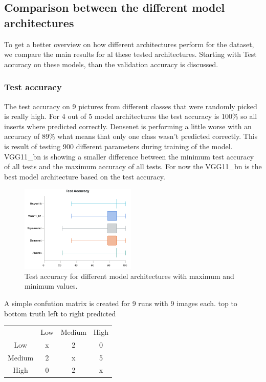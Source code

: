 \subsection{Comparison between the different model architectures}
	To get a better overview on how different architectures perform for the dataset, we compare the main results for al these tested architectures. Starting with Test accuracy on these models, than the validation accuracy is discussed.
	
	\subsubsection{Test accuracy}
	The test accuracy on 9 pictures from different classes that were randomly picked is really high. For 4 out of 5 model architectures the test accuracy is 100\% so all inserts where predicted correctly. Densenet is performing a little worse with an accuracy of 89\% what means that only one class wasn't predicted correctly. This is result of testing 900 different parameters during training of the model. VGG11\_bn is showing a smaller difference between the minimum test accuracy of all tests and the maximum accuracy of all tests. For now the VGG11\_bn is the best model architecture based on the test accuracy.
	
	\begin{figure}[hbtp]
		\centering
		\includegraphics[width=0.49\textwidth]{fig/results/wandb/second_handmade_sweep/charts/test_accuracy_boxplot.png}
		\caption{Test accuracy for different model architectures with maximum and minimum values.}
	\end{figure}
	
	A simple confution matrix is created for 9 runs with 9 images each. top to bottom truth left to right predicted
	\begin{center}
		\begin{tabular}{ c c c c }
						& Low 	& Medium & High	\\
		 Low 			& x 		& 2 			& 0		\\ 
		 Medium 	& 2 		& x 			& 5 		\\  
		 High 		& 0 		& 2 			& x   
		\end{tabular}
	\end{center}
	
